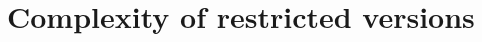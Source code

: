 %
\chapter{Complexity of restricted versions}

\newpage



\newpage

\newpage

\newpage

\newpage

%
